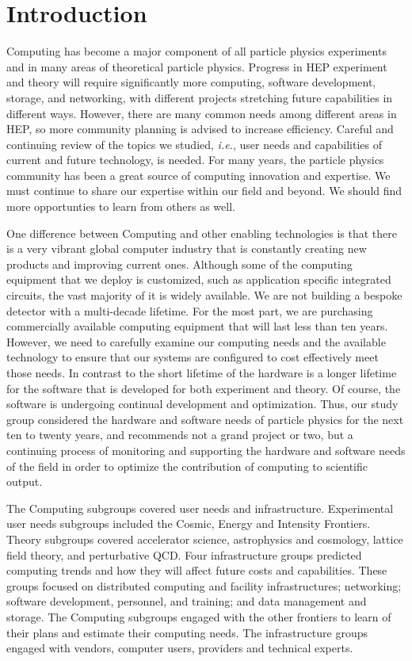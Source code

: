 

\section{Introduction}

Computing has become a major component of all particle physics experiments
and in many areas of theoretical particle physics. 
Progress in HEP experiment and theory will require significantly more
computing, software development, storage, and networking, with different
projects stretching future capabilities in different ways.  However, there
are many common needs among different areas in HEP, so more
community planning is advised to increase efficiency.
Careful and continuing review of the topics we studied, 
{\it i.e.}, user needs and capabilities of
current and future technology, is needed.  For many years, the particle physics
community has been a great source of computing innovation and expertise. 
We must continue to share our expertise within our field and beyond.
We should find more opportunties to learn from others as well.

One difference between Computing and other enabling technologies is that there is
a very vibrant global computer industry that is constantly creating new products
and improving current ones.  Although some of the computing equipment that we deploy
is customized, such as application specific integrated circuits, the vast
majority of it is widely available.  We are not building a bespoke detector with
a multi-decade lifetime.  For the most part, we are purchasing commercially available
computing equipment that will last less than ten years.  However, we need to
carefully examine our computing needs and the available technology
to ensure that our systems are configured to cost effectively meet those needs.
In contrast to the short lifetime of the hardware is a longer lifetime for the
software that is developed for both experiment and theory.  Of course, the software
is undergoing continual development and optimization.  Thus, our study group
considered the hardware and software needs of particle physics for the next
ten to twenty years, and recommends not a grand project or two, but a continuing
process of monitoring and supporting the hardware and software needs of the field
in order to optimize the contribution of computing to scientific output.

The Computing 
subgroups covered user needs and infrastructure.
Experimental user needs subgroups included the Cosmic, Energy and Intensity Frontiers.
Theory subgroups covered accelerator science,
astrophysics and cosmology, lattice field theory, and perturbative QCD.
Four infrastructure groups predicted computing trends and
how they will affect future costs and
capabilities. These groups focused on distributed computing and facility
infrastructures; networking; software development, personnel, and training; and
data management and storage. 
The Computing
subgroups engaged with the other frontiers to learn of
their plans and estimate their computing needs.  The infrastructure groups
engaged with vendors, computer users, providers and technical experts. 

